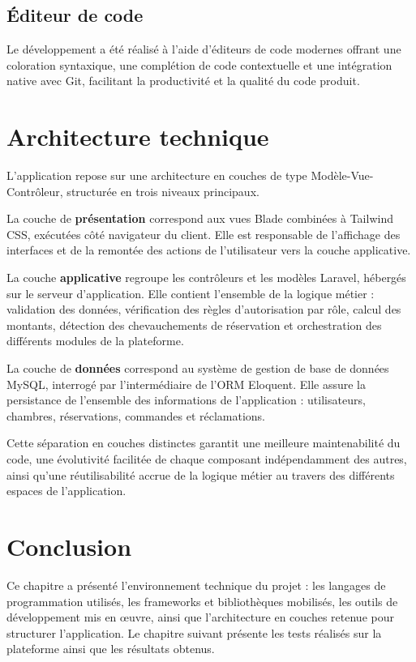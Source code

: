 \documentclass[12pt,a4paper]{report}
\begin{document}
\subsection{Éditeur de code}

Le développement a été réalisé à l'aide d'éditeurs de code modernes offrant
une coloration syntaxique, une complétion de code contextuelle et une
intégration native avec Git, facilitant la productivité et la qualité du
code produit.

\section{Architecture technique}

L'application repose sur une architecture en couches de type
Modèle-Vue-Contrôleur, structurée en trois niveaux principaux.

La couche de \textbf{présentation} correspond aux vues Blade combinées à
Tailwind CSS, exécutées côté navigateur du client. Elle est responsable de
l'affichage des interfaces et de la remontée des actions de l'utilisateur
vers la couche applicative.

La couche \textbf{applicative} regroupe les contrôleurs et les modèles
Laravel, hébergés sur le serveur d'application. Elle contient l'ensemble
de la logique métier : validation des données, vérification des règles
d'autorisation par rôle, calcul des montants, détection des
chevauchements de réservation et orchestration des différents modules de
la plateforme.

La couche de \textbf{données} correspond au système de gestion de base de
données MySQL, interrogé par l'intermédiaire de l'ORM Eloquent. Elle
assure la persistance de l'ensemble des informations de l'application :
utilisateurs, chambres, réservations, commandes et réclamations.

Cette séparation en couches distinctes garantit une meilleure
maintenabilité du code, une évolutivité facilitée de chaque composant
indépendamment des autres, ainsi qu'une réutilisabilité accrue de la
logique métier au travers des différents espaces de l'application.

\section{Conclusion}

Ce chapitre a présenté l'environnement technique du projet : les langages
de programmation utilisés, les frameworks et bibliothèques mobilisés, les
outils de développement mis en œuvre, ainsi que l'architecture en couches
retenue pour structurer l'application. Le chapitre suivant présente les
tests réalisés sur la plateforme ainsi que les résultats obtenus.
\end{document}
